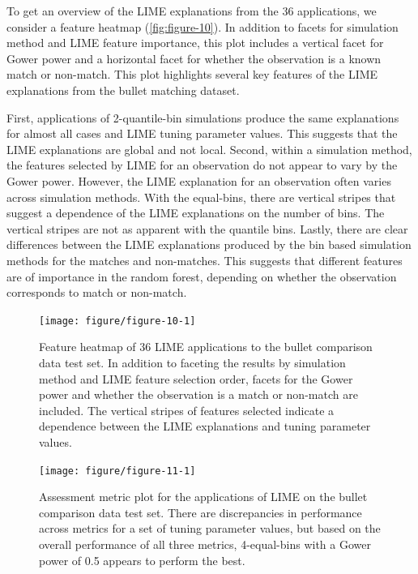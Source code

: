 \documentclass[AMS,STIX2COL]{WileyNJD-v2}\usepackage[]{graphicx}\usepackage[]{color}
\newenvironment{knitrout}{}{} %
\begin{document}
To get an overview of the LIME explanations from the 36 applications, we consider a feature heatmap (\autoref{fig:figure-10}). In addition to facets for simulation method and LIME feature importance, this plot includes a vertical facet for Gower power and a horizontal facet for whether the observation is a known match or non-match. This plot highlights several key features of the LIME explanations from the bullet matching dataset.

First, applications of 2-quantile-bin simulations produce the same explanations for almost all cases and LIME tuning parameter values. This suggests that the LIME explanations are global and not local. Second, within a simulation method, the features selected by LIME for an observation do not appear to vary by the Gower power. However, the LIME explanation for an observation often varies across simulation methods. With the equal-bins, there are vertical stripes that suggest a dependence of the LIME explanations on the number of bins. The vertical stripes are not as apparent with the quantile bins. Lastly, there are clear differences between the LIME explanations produced by the bin based simulation methods for the matches and non-matches. This suggests that different features are of importance in the random forest, depending on whether the observation corresponds to match or non-match.

\begin{figure}[!thp]
\begin{knitrout}
\color{fgcolor}

{\centering \texttt{[image: figure/figure-10-1]} 

}



\end{knitrout}
\caption{Feature heatmap of 36 LIME applications to the bullet comparison data test set. In addition to faceting the results by simulation method and LIME feature selection order, facets for the Gower power and whether the observation is a match or non-match are included. The vertical stripes of features selected indicate a dependence between the LIME explanations and tuning parameter values.}
\label{fig:figure-10}

\vspace*{\floatsep}

\begin{knitrout}
\color{fgcolor}

{\centering \texttt{[image: figure/figure-11-1]} 

}



\end{knitrout}
\caption{Assessment metric plot for the applications of LIME on the bullet comparison data test set. There are discrepancies in performance across metrics for a set of tuning parameter values, but based on the overall performance of all three metrics, 4-equal-bins with a Gower power of 0.5 appears to perform the best.}
\label{fig:figure-11}
\end{figure}
\end{document}
